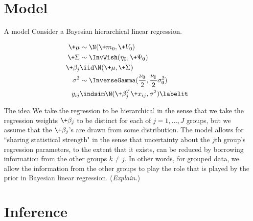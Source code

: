 \documentclass[10pt]{beamer}
\begin{document}
\section{Model}
\begin{frame}{A model}
Consider a Bayesian hierarchical linear regression.   

\begin{align*}
\+\mu &\sim  \N (\+m_0,\+V_0) \\
\+\Sigma &\sim \InvWish(\eta_0, \+\Psi_0) \\
\+\beta_j &\iid \N(\+\mu,  \+\Sigma) \\
\sigma^2 &\sim \InverseGamma (\frac{\nu_0}{2}, \frac{\nu_0}{2} \sigma_0^2) \\
y_{ij}  &\indsim \N(\+\beta_j^T \+x_{ij} , \sigma^2) 
\labelit \label{eqn:hierarchical_linear_regression}
\end{align*}
	
\begin{block}{The idea}
 \scriptsize We take the regression to be hierarchical in the sense that we take the regression weights $\+\beta_j$ to be distinct for each of $j=1,...,J$ groups,  but we assume that the $\+\beta_j$'s are drawn from some distribution.     The model allows for ``sharing statistical strength" in the sense that uncertainty about the $j$th group's regression parameters,  to the extent that it exists,  can be reduced by borrowing information from the other groups $k \neq j$.    In other words,  for grouped data,  we allow the information from the other groups to play the role that is played by the prior in Bayesian linear regression. (\textit{Explain.})
\end{block}
\end{frame}

\section{Inference}
\end{document}
